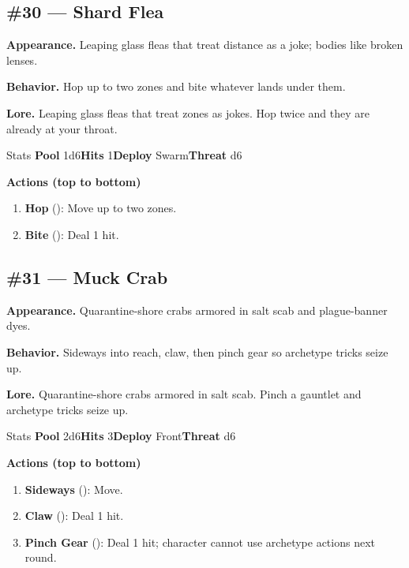 \subsection*{\#30 --- Shard Flea}

\textbf{Appearance.} Leaping glass fleas that treat distance as a joke; bodies like broken lenses.

\textbf{Behavior.} Hop up to two zones and bite whatever lands under them.

\textbf{Lore.} Leaping glass fleas that treat zones as jokes. Hop twice and they are already at your throat.

\begin{monsterentry}{Stats}
\textbf{Pool} 1d6\quad\textbf{Hits} 1\quad\textbf{Deploy} Swarm\quad\textbf{Threat} d6

\textbf{Actions (top to bottom)}
\begin{enumerate}\setlength{\itemsep}{0.15em}\setlength{\parskip}{0pt}
  \item \textbf{Hop} (\easy): Move up to two zones.
  \item \textbf{Bite} (\easy): Deal 1 hit.
\end{enumerate}
\end{monsterentry}

\subsection*{\#31 --- Muck Crab}

\textbf{Appearance.} Quarantine-shore crabs armored in salt scab and plague-banner dyes.

\textbf{Behavior.} Sideways into reach, claw, then pinch gear so archetype tricks seize up.

\textbf{Lore.} Quarantine-shore crabs armored in salt scab. Pinch a gauntlet and archetype tricks seize up.

\begin{monsterentry}{Stats}
\textbf{Pool} 2d6\quad\textbf{Hits} 3\quad\textbf{Deploy} Front\quad\textbf{Threat} d6

\textbf{Actions (top to bottom)}
\begin{enumerate}\setlength{\itemsep}{0.15em}\setlength{\parskip}{0pt}
  \item \textbf{Sideways} (\easy): Move.
  \item \textbf{Claw} (\medium): Deal 1 hit.
  \item \textbf{Pinch Gear} (\hard): Deal 1 hit; character cannot use archetype actions next round.
\end{enumerate}
\end{monsterentry}

